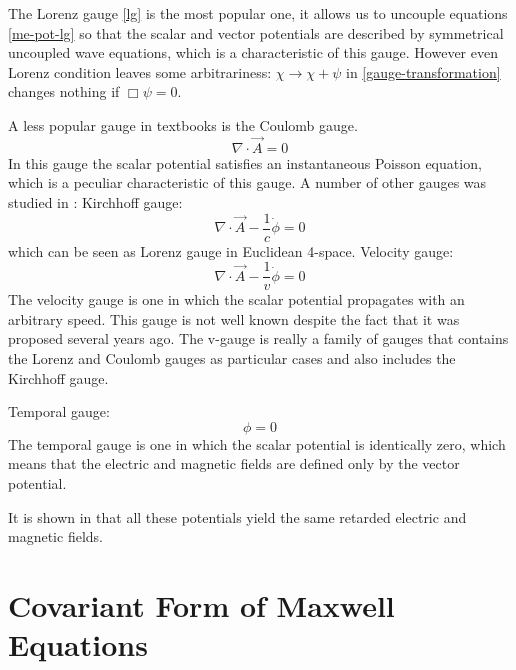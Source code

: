 The Lorenz gauge \eqref{lg} is the most popular one, it
allows us to uncouple equations \eqref{me-pot-lg}   so that the scalar and vector
potentials are described by symmetrical uncoupled wave equations,
which is a characteristic of this gauge. 
However even Lorenz condition leaves some arbitrariness: $ \chi \rightarrow \chi + \psi $ 
 in \eqref{gauge-transformation} changes nothing if $ \Box \psi=0 $.

A less popular gauge in textbooks is the Coulomb gauge.
\begin{equation}
   \label {cg}
   \nabla \cdot \vec A=0
\end{equation}
In this gauge the scalar potential satisfies an instantaneous
Poisson equation, which is a peculiar characteristic of this
gauge.
A number of other gauges was studied in \cite{heras}:
Kirchhoff gauge:
\begin{equation}
   \label {kg}
    \nabla \cdot \vec A- \frac{1}{c} \dot \phi=0
\end{equation}
which can be seen as Lorenz gauge in Euclidean 4-space.
Velocity gauge:
\begin{equation}
   \label {vg}
    \nabla \cdot \vec A- \frac{1}{v} \dot \phi=0
\end{equation}
The velocity gauge is one in which the scalar
potential propagates with an arbitrary speed. This gauge is
not well known despite the fact that it was proposed several
years ago. The v-gauge is really a family of gauges that
contains the Lorenz and Coulomb gauges as particular cases
and also includes the Kirchhoff gauge.

Temporal gauge:
\begin{equation}
   \label {tg}
   \phi=0
\end{equation}
 The temporal gauge is one in which 
the scalar potential is identically zero, which means that 
the electric and magnetic fields are defined 
only by the vector potential.

It is shown in \cite{heras} that  all these  potentials yield the 
same  retarded
electric and magnetic fields. 

\section {Covariant Form of Maxwell Equations}
\label{me-cov}

